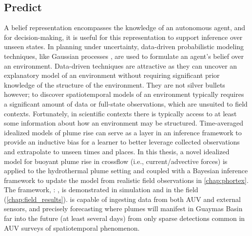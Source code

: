 \subsection{Predict}
A belief representation encompasses the knowledge of an autonomous agent, and for decision-making, it is useful for this representation to support inference over unseen states. 
In planning under uncertainty, data-driven probabilistic modeling techniques, like Gaussian processes \autocite{Rasmussen2004}, are used to formulate an agent's belief over an environment.
Data-driven techniques are attractive as they can uncover an explanatory model of an environment without requiring significant prior knowledge of the structure of the environment.
They are not silver bullets however; to discover spatiotemporal models of an environment typically requires a significant amount of data or full-state observations, which are unsuited to field contexts.
Fortunately, in scientific contexts there is typically access to at least some information about how an environment may be structured.
Time-averaged idealized models of plume rise can serve as a layer in an inference framework to provide an inductive bias for a learner to better leverage collected observations and extrapolate to unseen times and places.
In this thesis, a novel idealized model for buoyant plume rise in crossflow (i.e., current/advective forces) is applied to the hydrothermal plume setting \autocite{tohidi2016highly} and coupled with a Bayesian inference framework to update the model from realistic field observations in \cref{chap:phortex}.
The framework, \PHUMES: \phumes, is demonstrated in simulation and in the field (\cref{chap:field_results}).
\PHUMES is capable of ingesting data from both AUV \Sentry and external sensors, and precisely forecasting where plumes will manifest in Guaymas Basin far into the future (at least several days) from only sparse detections common in AUV surveys of spatiotemporal phenomenon.

